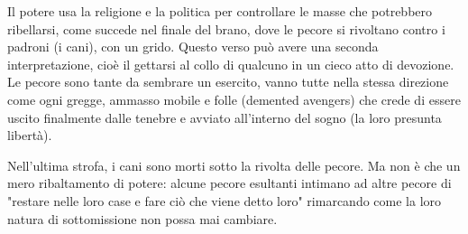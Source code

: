 \documentclass[class=book, crop=false, oneside, 12pt]{standalone}
\begin{document}
Il potere usa la religione e la politica per controllare le masse che potrebbero ribellarsi, come succede nel finale del brano, dove le pecore si rivoltano contro i padroni (i cani), con un grido. Questo verso può avere una seconda interpretazione, cioè il gettarsi al collo di qualcuno in un cieco atto di devozione. Le pecore sono tante da sembrare un esercito, vanno tutte nella stessa direzione come ogni gregge, ammasso mobile e folle (demented avengers) che crede di essere uscito finalmente dalle tenebre e avviato all'interno del sogno (la loro presunta libertà).

Nell'ultima strofa, i cani sono morti sotto la rivolta delle pecore. Ma non è che un mero ribaltamento di potere: alcune pecore esultanti intimano ad altre pecore di "restare nelle loro case e fare ciò che viene detto loro" rimarcando come la loro natura di sottomissione non possa mai cambiare.
\end{document}
